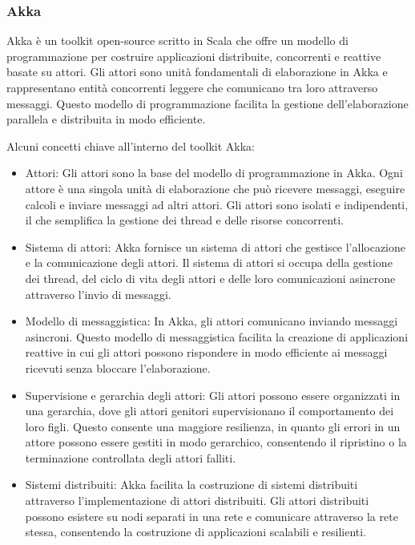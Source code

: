 \documentclass[12pt]{article}
\begin{document}
\subsubsection{Akka}

Akka è un toolkit open-source scritto in Scala che offre un modello di programmazione per costruire applicazioni distribuite, concorrenti e reattive basate su attori. Gli attori sono unità fondamentali di elaborazione in Akka e rappresentano entità concorrenti leggere che comunicano tra loro attraverso messaggi. Questo modello di programmazione facilita la gestione dell'elaborazione parallela e distribuita in modo efficiente.

Alcuni concetti chiave all'interno del toolkit Akka:

\begin{itemize}
    \item Attori: Gli attori sono la base del modello di programmazione in Akka. Ogni attore è una singola unità di elaborazione che può ricevere messaggi, eseguire calcoli e inviare messaggi ad altri attori. Gli attori sono isolati e indipendenti, il che semplifica la gestione dei thread e delle risorse concorrenti.
    \item Sistema di attori: Akka fornisce un sistema di attori che gestisce l'allocazione e la comunicazione degli attori. Il sistema di attori si occupa della gestione dei thread, del ciclo di vita degli attori e delle loro comunicazioni asincrone attraverso l'invio di messaggi.
    \item Modello di messaggistica: In Akka, gli attori comunicano inviando messaggi asincroni. Questo modello di messaggistica facilita la creazione di applicazioni reattive in cui gli attori possono rispondere in modo efficiente ai messaggi ricevuti senza bloccare l'elaborazione.
    \item Supervisione e gerarchia degli attori: Gli attori possono essere organizzati in una gerarchia, dove gli attori genitori supervisionano il comportamento dei loro figli. Questo consente una maggiore resilienza, in quanto gli errori in un attore possono essere gestiti in modo gerarchico, consentendo il ripristino o la terminazione controllata degli attori falliti.
    \item Sistemi distribuiti: Akka facilita la costruzione di sistemi distribuiti attraverso l'implementazione di attori distribuiti. Gli attori distribuiti possono esistere su nodi separati in una rete e comunicare attraverso la rete stessa, consentendo la costruzione di applicazioni scalabili e resilienti.
\end{itemize}
\end{document}
